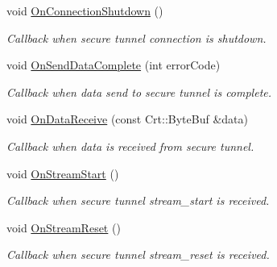 \begin{DoxyCompactItemize}
void \hyperlink{class_aws_1_1_iot_1_1_device_client_1_1_secure_tunneling_1_1_secure_tunneling_context_a5b1f07f8a5b26e4f698430589ce4b6c4}{On\+Connection\+Shutdown} ()
\begin{DoxyCompactList}\small\item\em Callback when secure tunnel connection is shutdown. \end{DoxyCompactList}\item 
void \hyperlink{class_aws_1_1_iot_1_1_device_client_1_1_secure_tunneling_1_1_secure_tunneling_context_ae65a8bbb27479f1310a708f354c35b9d}{On\+Send\+Data\+Complete} (int error\+Code)
\begin{DoxyCompactList}\small\item\em Callback when data send to secure tunnel is complete. \end{DoxyCompactList}\item 
void \hyperlink{class_aws_1_1_iot_1_1_device_client_1_1_secure_tunneling_1_1_secure_tunneling_context_a778a6fd8e30ec1c14d4b57443acdb5ac}{On\+Data\+Receive} (const Crt\+::\+Byte\+Buf \&data)
\begin{DoxyCompactList}\small\item\em Callback when data is received from secure tunnel. \end{DoxyCompactList}\item 
\mbox{\label{class_aws_1_1_iot_1_1_device_client_1_1_secure_tunneling_1_1_secure_tunneling_context_a35943770e783bc406b867dc951c107a2}} 
void \hyperlink{class_aws_1_1_iot_1_1_device_client_1_1_secure_tunneling_1_1_secure_tunneling_context_a35943770e783bc406b867dc951c107a2}{On\+Stream\+Start} ()
\begin{DoxyCompactList}\small\item\em Callback when secure tunnel stream\+\_\+start is received. \end{DoxyCompactList}\item 
\mbox{\label{class_aws_1_1_iot_1_1_device_client_1_1_secure_tunneling_1_1_secure_tunneling_context_a3900c7ed3eeaa110d440d3b7763c07ac}} 
void \hyperlink{class_aws_1_1_iot_1_1_device_client_1_1_secure_tunneling_1_1_secure_tunneling_context_a3900c7ed3eeaa110d440d3b7763c07ac}{On\+Stream\+Reset} ()
\begin{DoxyCompactList}\small\item\em Callback when secure tunnel stream\+\_\+reset is received. \end{DoxyCompactList}\item 

\end{DoxyCompactItemize}
